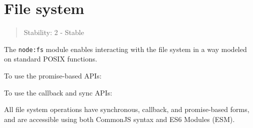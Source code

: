 \section{File system}\label{file-system}

\begin{quote}
Stability: 2 - Stable
\end{quote}

The \texttt{node:fs} module enables interacting with the file system in
a way modeled on standard POSIX functions.

To use the promise-based APIs:

\begin{Shaded}
\begin{Highlighting}[]
 \OperatorTok{*}  \OperatorTok{;}
\end{Highlighting}
\end{Shaded}

\begin{Shaded}
\begin{Highlighting}[]
\OperatorTok{=} \NormalTok{(}\NormalTok{)}\OperatorTok{;}
\end{Highlighting}
\end{Shaded}

To use the callback and sync APIs:

\begin{Shaded}
\begin{Highlighting}[]
 \OperatorTok{*}  \OperatorTok{;}
\end{Highlighting}
\end{Shaded}

\begin{Shaded}
\begin{Highlighting}[]
\OperatorTok{=} \NormalTok{(}\NormalTok{)}\OperatorTok{;}
\end{Highlighting}
\end{Shaded}

All file system operations have synchronous, callback, and promise-based
forms, and are accessible using both CommonJS syntax and ES6 Modules
(ESM).

